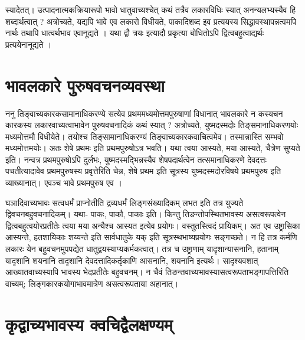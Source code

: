 स्यादेतत्। उत्पादनात्मकक्रियारूपो भावो धातुवाच्यश्चेत् कथं तत्रैव लकारविधिः स्यात् अनन्यलभ्यस्यैव हि शब्दार्थत्वात् ? अत्रोच्यते, यद्यपि भावे एव लकारो विधीयते, पाकादिशब्द इव प्रत्ययस्य सिद्धावस्थापन्नत्वमपि नार्थः तथापि धात्वर्थभाव एवानूद्यते । यथा द्वौ त्रयः इत्यादौ प्रकृत्या बोधितोऽपि द्वित्वबहुत्वाद्यर्थः प्रत्ययेनानूद्यते ।

\section*{भावलकारे पुरुषवचनव्यवस्था} 

ननु तिङ्वाच्यकारकसामानाधिकरण्ये सत्येव प्रथममध्यमोत्तमपुरुषाणां विधानात् भावलकारे न कस्यचन कारकस्य लकारवाच्यत्वाभावेन पुरुषवचनादिकं कथं स्यात् ? अत्रोच्यते, युष्मदस्मदोः तिङ्समानाधिकरणयोः मध्यमोत्तमौ विधीयेते। तयोश्च तिङ्सामानाधिकरण्यं तिङ्वाच्यकारकवाचित्वमेव। तस्मान्नास्ति सम्भवो मध्यमोत्तमयोः। अतः शेषे प्रथमः इति प्रथमपुरुषोऽत्र भवति। यथा त्वया आस्यते, मया आस्यते, चैत्रेण सुप्यते इति। नन्वत्र प्रथमपुरुषोऽपि दुर्लभः, युष्मदस्मद्भिन्नस्यैव शेषपदार्थत्वेन तत्समानाधिकरणे देवदत्तः पचतीत्यादावेव प्रथमपुरुषस्य प्रवृत्तेरिति चेन्न, शेषे प्रथम इति सूत्रस्य युष्मदस्मदोरविषये प्रथमपुरुष इति व्याख्यानात्। एवञ्च भावे प्रथमपुरुष एव ।

घञादिवाच्यभावः सत्वधर्मं प्राप्नोतीति द्रव्यधर्मं लिङ्गसंख्यादिकम् लभत इति तत्र युज्यते द्विवचनबहुवचनादिकम्। यथा- पाकः, पाकौ, पाकाः इति। किन्तु तिङन्तोपस्थितभावस्य असत्वरूपत्वेन द्वित्वबहुत्वयोरप्रतीतेः त्वया मया अन्यैश्च आस्यत इत्येव प्रयोगः। वस्तुतस्त्विदं प्रायिकम्। अत एव उष्ट्रासिका आस्यन्ते, हतशायिकाः शय्यन्ते इति सार्वधातुके यक् इति सूत्रस्थभाष्यप्रयोगः सङ्गच्छते। न हि तत्र कर्मणि लकारः येन बहुवचनमुपपद्येत धातुद्वयस्याप्यकर्मकत्वात्। तत्र च उष्ट्राणाम् यादृशान्यासनानि, हतानाम् यादृशानि शयनानि तादृशानि देवदत्तादिकर्तृकाणि आसनानि, शयनानि इत्यर्थः। सादृश्यवशात् आख्यातवाच्यस्यापि भावस्य भेदप्रतीतेः बहुवचनम्। न चैवं तिङन्तवाच्यभावस्यासत्वरूपताभङ्गापत्तिरिति वाच्यम्; लिङ्गकारकयोगाभावमात्रेण असत्वरूपताया अहानात्।

\section*{कृद्वाच्यभावस्य क्वचिद्वैलक्षण्यम्} 

